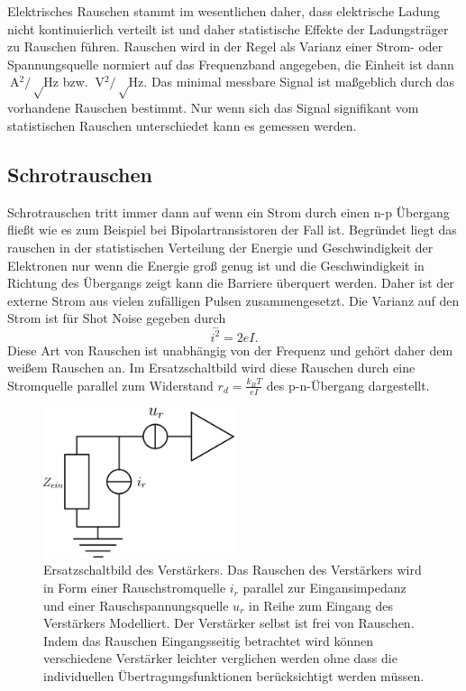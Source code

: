 Elektrisches Rauschen stammt im wesentlichen daher, dass elektrische Ladung nicht kontinuierlich verteilt ist und daher statistische Effekte der Ladungsträger zu Rauschen führen.
Rauschen wird in der Regel als Varianz einer Strom- oder Spannungsquelle normiert auf das Frequenzband angegeben, die Einheit ist dann $\SI{}{\ampere^2\per\sqrt\hertz}$ bzw. $\SI{}{\volt^2\per\sqrt\hertz}$.
Das minimal messbare Signal ist maßgeblich durch das vorhandene Rauschen bestimmt.
Nur wenn sich das Signal signifikant vom statistischen Rauschen unterschiedet kann es gemessen werden.\cite{Gray}

\subsection*{Schrotrauschen}
Schrotrauschen tritt immer dann auf wenn ein Strom durch einen n-p Übergang fließt wie es zum Beispiel bei Bipolartransistoren der Fall ist.
Begründet liegt das rauschen in der statistischen Verteilung der Energie und Geschwindigkeit der Elektronen nur wenn die Energie groß genug ist und die Geschwindigkeit in Richtung des Übergangs zeigt kann die Barriere überquert werden.
Daher ist der externe Strom aus vielen zufälligen Pulsen zusammengesetzt.
Die Varianz auf den Strom ist für Shot Noise gegeben durch
\begin{equation}
\stackrel{-}{i^2} = 2eI.
\end{equation}
Diese Art von Rauschen ist unabhängig von der Frequenz und gehört daher dem weißem Rauschen an.
Im Ersatzschaltbild wird diese Rauschen durch eine Stromquelle parallel zum Widerstand $r_d = \frac{k_BT}{eI}$ des p-n-Übergang dargestellt.

\begin{figure}[!t]
\begin{center}
\includegraphics[width=0.50\textwidth]{./fig/NoiseSchematic.pdf}
\vspace{-0.5cm}
\caption{Ersatzschaltbild des Verstärkers.
Das Rauschen des Verstärkers wird in Form einer Rauschstromquelle $i_r$ parallel zur Eingansimpedanz und einer Rauschspannungsquelle $u_r$ in Reihe zum Eingang des Verstärkers Modelliert.
Der Verstärker selbst ist frei von Rauschen.
Indem das Rauschen Eingangsseitig betrachtet wird können verschiedene Verstärker leichter verglichen werden ohne dass die individuellen Übertragungsfunktionen berücksichtigt werden müssen.}
\label{fig:NoiseSchematic}
\end{center}
\end{figure}

